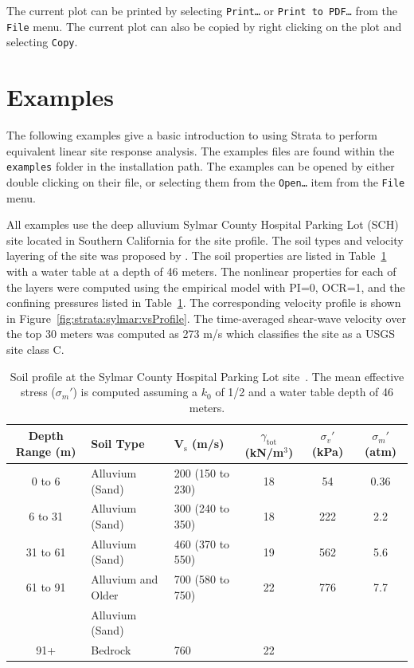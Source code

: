 \documentclass[11pt]{report}
\begin{document}
The current plot can be printed by selecting \texttt{Print\dots} or \texttt{Print to PDF\dots} from
the \texttt{File} menu.  The current plot can also be copied by right clicking on the plot and
selecting \texttt{Copy}.

\section{Examples}
The following examples give a basic introduction to using Strata to perform equivalent linear site
response analysis.  The examples files are found within the \texttt{examples} folder in the
installation path.  The examples can be opened by either double clicking on their file, or selecting
them from the \texttt{Open\dots} item from the \texttt{File} menu.

All examples use the deep alluvium Sylmar County Hospital Parking Lot (SCH) site located in Southern
California for the site profile.  The soil types and velocity layering of the site was proposed by
\citet{chang:96}.  The soil properties are listed in Table~\ref{tab:strata:sylmar:soil} with a water
table at a depth of 46 meters. The nonlinear properties for each of the layers were computed using
the \citet{darendeli:01} empirical model with PI=0, OCR=1, and the confining pressures listed in
Table~\ref{tab:strata:sylmar:soil}.  The corresponding velocity profile is shown in
Figure~\ref{fig:strata:sylmar:vsProfile}. The time-averaged shear-wave velocity over the top 30
meters was computed as 273 m/s which classifies the site as a USGS site class C.

\begin{table}
  \centering
  \begin{tabular}{cllccc}
	\hline\hline
	\textbf{Depth Range} (m) & \textbf{Soil Type} & \textbf{V$_\text{s}$} (m/s) &
	\textbf{$\gamma_\text{tot}$} (kN/m$^3$) & \textbf{$\sigma_v'$} (kPa) & \textbf{$\sigma_{m}'$} (atm) \\
	\hline
	0 to 6 & Alluvium (Sand) & 200 (150 to 230) & 18 & 54 & 0.36\\
	6 to 31 & Alluvium (Sand) & 300 (240 to 350) & 18 & 222 & 2.2 \\
	31 to 61 & Alluvium (Sand) & 460 (370 to 550) & 19 & 562 & 5.6 \\
	61 to 91 & Alluvium and Older & 700 (580 to 750) & 22 & 776 & 7.7 \\
	& Alluvium (Sand) \\
	91+ & Bedrock & 760 & 22 \\
	\hline\hline
  \end{tabular}
  \caption{Soil profile at the Sylmar County Hospital Parking Lot site~\citep{chang:96}. The mean
  effective stress ($\sigma_{m}'$) is computed assuming a $k_0$ of 1/2 and a water table depth of 46
  meters.}
  \label{tab:strata:sylmar:soil}
\end{table}
\end{document}

